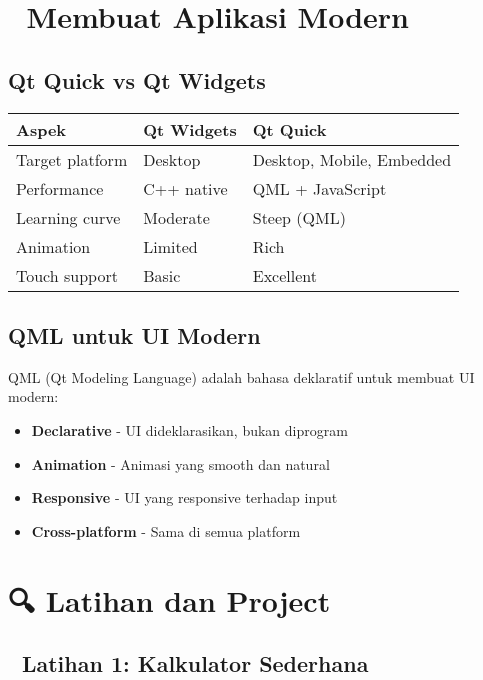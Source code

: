 \section{📱 Membuat Aplikasi Modern}

\subsection{Qt Quick vs Qt Widgets}

\begin{center}
\begin{tabular}{|l|l|l|}
\hline
\textbf{Aspek} & \textbf{Qt Widgets} & \textbf{Qt Quick} \\
\hline
Target platform & Desktop & Desktop, Mobile, Embedded \\
\hline
Performance & C++ native & QML + JavaScript \\
\hline
Learning curve & Moderate & Steep (QML) \\
\hline
Animation & Limited & Rich \\
\hline
Touch support & Basic & Excellent \\
\hline
\end{tabular}
\end{center}

\subsection{QML untuk UI Modern}

QML (Qt Modeling Language) adalah bahasa deklaratif untuk membuat UI modern:
\begin{itemize}
\item \textbf{Declarative} - UI dideklarasikan, bukan diprogram
\item \textbf{Animation} - Animasi yang smooth dan natural
\item \textbf{Responsive} - UI yang responsive terhadap input
\item \textbf{Cross-platform} - Sama di semua platform
\end{itemize}

\section{🔍 Latihan dan Project}

\subsection{📝 Latihan 1: Kalkulator Sederhana}

